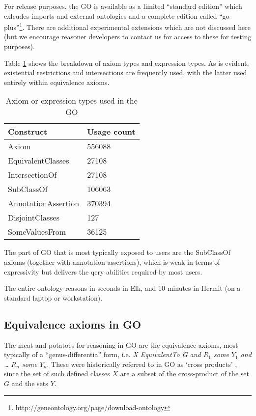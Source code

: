 \documentclass{llncs}
\begin{document}
For release purposes, the GO is available as a limited ``standard
edition'' which exlcudes imports and external ontologies and a
complete edition called
``go-plus''\footnote{http://geneontology.org/page/download-ontology}. There
are additional experimental extensions which are not discussed here
(but we encourage reasoner developers to contact us for access to
these for testing purposes).

Table \ref{tab:constructs} shows the breakdown of axiom types and
expression types. As is evident, existential restrictions and
intersections are frequently used, with the latter used entirely
within equivalence axioms.

\begin{table}
\begin{tabular}{ | p{4cm} | p{3cm} |  }
\hline
\textbf{Construct} & \textbf{Usage count}  \\
\hline
Axiom & 556088 \\
EquivalentClasses & 27108 \\
IntersectionOf & 27108 \\
SubClassOf & 106063  \\
AnnotationAssertion & 370394 \\
DisjointClasses & 127 \\
SomeValuesFrom & 36125 \\
\hline
\end{tabular}
\caption{Axiom or expression types used in the GO }
\label{tab:constructs}
\end{table}

The part of GO that is most typically exposed to users are the
SubClassOf axioms (together with annotation assertions), which is weak
in terms of expressivity but delivers the qery abilities required by
most users.

The entire ontology reasons in seconds in Elk\cite{kazakov2012elk}, and 10
minutes in Hermit (on a standard laptop or workstation).

\subsection{Equivalence axioms in GO}

The meat and potatoes for reasoning in GO are the equivalence axioms,
most typically of a ``genus-differentia'' form, i.e. \emph{X
  EquivalentTo G and $R_1$ some $Y_1$ and … $R_n$ some $Y_n$}. These were
historically referred to in GO as `cross
products' \cite{Mungall2010GOXP}, since the set of such defined classes
$X$ are a subset of the cross-product of the set $G$ and the sets
$Y$.
\end{document}
